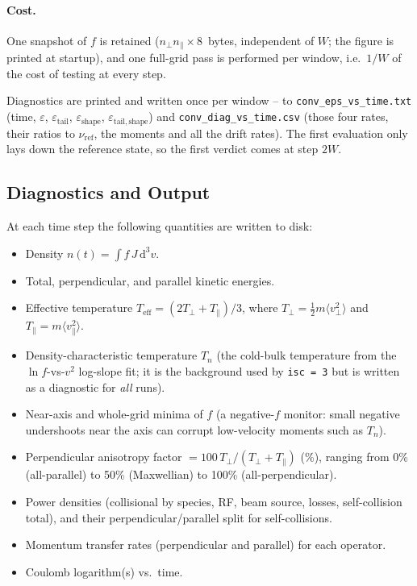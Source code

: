 \documentclass[11pt,a4paper]{article}
\newcommand{\vp}{v_\perp}
\newcommand{\vpa}{v_\parallel}
\begin{document}
\paragraph{Cost.}  One snapshot of $f$ is retained
($n_\perp n_\parallel \times 8$~bytes, independent of $W$; the figure is printed
at startup), and one full-grid pass is performed per window, i.e.\ $1/W$ of the
cost of testing at every step.

Diagnostics are printed and written once per window -- to
\texttt{conv\_eps\_vs\_time.txt} (time, $\varepsilon$,
$\varepsilon_\mathrm{tail}$, $\varepsilon_\mathrm{shape}$,
$\varepsilon_\mathrm{tail,shape}$) and \texttt{conv\_diag\_vs\_time.csv}
(those four rates, their ratios to $\nu_\mathrm{ref}$, the moments and all the
drift rates).  The first evaluation only lays down the reference state, so the
first verdict comes at step $2W$.

\subsection{Diagnostics and Output}

At each time step the following quantities are written to disk:
\begin{itemize}
  \item Density $n(t) = \int f\,J\,\mathrm{d}^3v$.
  \item Total, perpendicular, and parallel kinetic energies.
  \item Effective temperature $T_\mathrm{eff} = (2T_\perp + T_\parallel)/3$,
        where $T_\perp = \tfrac{1}{2}m\langle \vp^2 \rangle$ and
        $T_\parallel = m\langle \vpa^2 \rangle$.
  \item Density-characteristic temperature $T_n$ (the cold-bulk temperature from
        the $\ln f$-vs-$v^2$ log-slope fit; it is the background used by
        \texttt{isc = 3} but is written as a diagnostic for \emph{all} runs).
  \item Near-axis and whole-grid minima of $f$ (a negative-$f$ monitor: small
        negative undershoots near the axis can corrupt low-velocity moments such
        as $T_n$).
  \item Perpendicular anisotropy factor $= 100\,T_\perp/(T_\perp + T_\parallel)$
        (\%), ranging from 0\% (all-parallel) to 50\% (Maxwellian) to 100\%
        (all-perpendicular).
  \item Power densities (collisional by species, RF, beam source, losses,
        self-collision total), and their perpendicular/parallel split for
        self-collisions.
  \item Momentum transfer rates (perpendicular and parallel) for each
        operator.
  \item Coulomb logarithm(s) vs.\ time.
\end{itemize}
\end{document}
